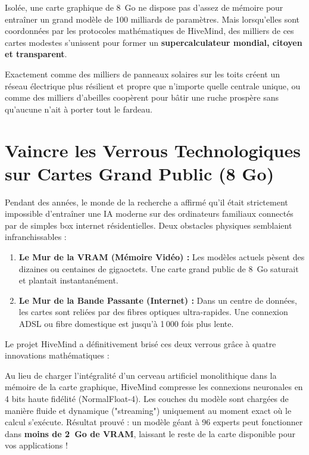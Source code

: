 \documentclass[11pt,a4paper]{article}
\begin{document}
Isolée, une carte graphique de 8~Go ne dispose pas d'assez de mémoire pour entraîner un grand modèle de 100 milliards de paramètres. Mais lorsqu'elles sont coordonnées par les protocoles mathématiques de HiveMind, des milliers de ces cartes modestes s'unissent pour former un \textbf{supercalculateur mondial, citoyen et transparent}. 

Exactement comme des milliers de panneaux solaires sur les toits créent un réseau électrique plus résilient et propre que n'importe quelle centrale unique, ou comme des milliers d'abeilles coopèrent pour bâtir une ruche prospère sans qu'aucune n'ait à porter tout le fardeau.

\section{Vaincre les Verrous Technologiques sur Cartes Grand Public (8 Go)}

Pendant des années, le monde de la recherche a affirmé qu'il était strictement impossible d'entraîner une IA moderne sur des ordinateurs familiaux connectés par de simples box internet résidentielles. Deux obstacles physiques semblaient infranchissables :

\begin{enumerate}[leftmargin=1.8em]
    \item \textbf{Le Mur de la VRAM (Mémoire Vidéo) :} Les modèles actuels pèsent des dizaines ou centaines de gigaoctets. Une carte grand public de 8~Go saturait et plantait instantanément.
    \item \textbf{Le Mur de la Bande Passante (Internet) :} Dans un centre de données, les cartes sont reliées par des fibres optiques ultra-rapides. Une connexion ADSL ou fibre domestique est jusqu'à 1\,000 fois plus lente.
\end{enumerate}

Le projet HiveMind a définitivement brisé ces deux verrous grâce à quatre innovations mathématiques :

\begin{tcolorbox}[title=1. Le Streaming NF4 en 4 Bits (Fini la Saturation Mémoire)]
Au lieu de charger l'intégralité d'un cerveau artificiel monolithique dans la mémoire de la carte graphique, HiveMind compresse les connexions neuronales en 4 bits haute fidélité (NormalFloat-4). Les couches du modèle sont chargées de manière fluide et dynamique ("streaming") uniquement au moment exact où le calcul s'exécute. Résultat prouvé : un modèle géant à 96 experts peut fonctionner dans \textbf{moins de 2~Go de VRAM}, laissant le reste de la carte disponible pour vos applications !
\end{tcolorbox}
\end{document}
